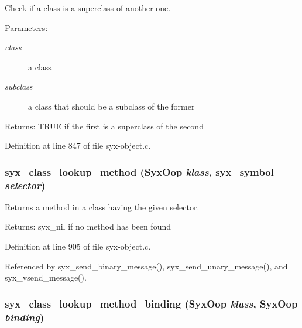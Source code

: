 Check if a class is a superclass of another one.

\begin{Desc}
\item[Parameters:]
\begin{description}
\item[{\em class}]a class \item[{\em subclass}]a class that should be a subclass of the former \end{description}
\end{Desc}
\begin{Desc}
\item[Returns:]TRUE if the first is a superclass of the second \end{Desc}


Definition at line 847 of file syx-object.c.\hypertarget{syx-object_8c_0dfdb8f628bc53241e404e0a7a0c1004}{
\subsubsection{ syx\_\-class\_\-lookup\_\-method ({\bf SyxOop} {\em klass}, \/  {\bf syx\_\-symbol} {\em selector})}}
\label{syx-object_8c_0dfdb8f628bc53241e404e0a7a0c1004}


Returns a method in a class having the given selector.

\begin{Desc}
\item[Returns:]syx\_\-nil if no method has been found \end{Desc}


Definition at line 905 of file syx-object.c.

Referenced by syx\_\-send\_\-binary\_\-message(), syx\_\-send\_\-unary\_\-message(), and syx\_\-vsend\_\-message().\hypertarget{syx-object_8c_991b1329938b84d777d0ad23f778dba9}{
\subsubsection{ syx\_\-class\_\-lookup\_\-method\_\-binding ({\bf SyxOop} {\em klass}, \/  {\bf SyxOop} {\em binding})}}
\label{syx-object_8c_991b1329938b84d777d0ad23f778dba9}


